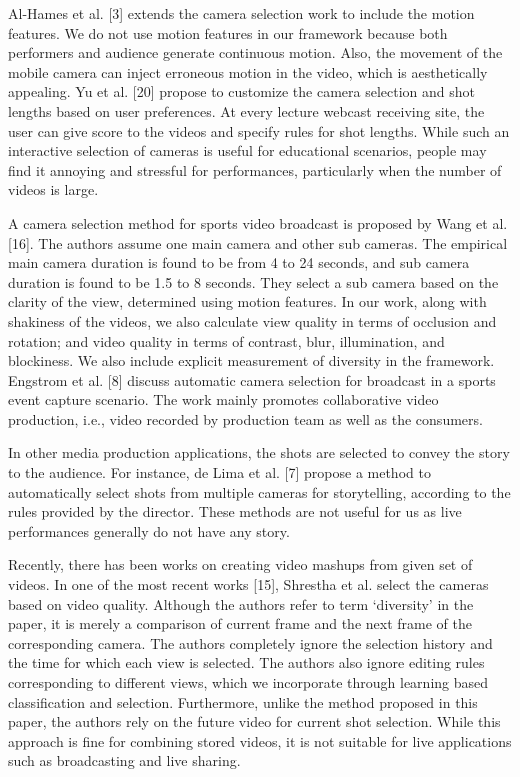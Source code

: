 \documentclass{sig-alternate-05-2015}
\begin{document}
Al-Hames et al. [3] extends the camera selection work to include
the motion features. We do not use motion features in our framework
because both performers and audience generate continuous
motion. Also, the movement of the mobile camera can inject erroneous
motion in the video, which is aesthetically appealing. Yu et
al. [20] propose to customize the camera selection and shot lengths
based on user preferences. At every lecture webcast receiving site,
the user can give score to the videos and specify rules for shot
lengths. While such an interactive selection of cameras is useful
for educational scenarios, people may find it annoying and stressful
for performances, particularly when the number of videos is
large.

A camera selection method for sports video broadcast is proposed
by Wang et al. [16]. The authors assume one main camera
and other sub cameras. The empirical main camera duration is
found to be from 4 to 24 seconds, and sub camera duration is found
to be 1.5 to 8 seconds. They select a sub camera based on the clarity
of the view, determined using motion features. In our work,
along with shakiness of the videos, we also calculate view quality
in terms of occlusion and rotation; and video quality in terms
of contrast, blur, illumination, and blockiness. We also include
explicit measurement of diversity in the framework. Engstrom et
al. [8] discuss automatic camera selection for broadcast in a sports
event capture scenario. The work mainly promotes collaborative
video production, i.e., video recorded by production team as well
as the consumers.

In other media production applications, the shots are selected to
convey the story to the audience. For instance, de Lima et al. [7] propose a method to automatically select shots from multiple cameras
for storytelling, according to the rules provided by the director.
These methods are not useful for us as live performances generally
do not have any story.

Recently, there has been works on creating video mashups from
given set of videos. In one of the most recent works [15], Shrestha
et al. select the cameras based on video quality. Although the authors
refer to term ‘diversity’ in the paper, it is merely a comparison
of current frame and the next frame of the corresponding camera.
The authors completely ignore the selection history and the
time for which each view is selected. The authors also ignore editing
rules corresponding to different views, which we incorporate
through learning based classification and selection. Furthermore,
unlike the method proposed in this paper, the authors rely on the
future video for current shot selection. While this approach is fine
for combining stored videos, it is not suitable for live applications
such as broadcasting and live sharing.
\end{document}

